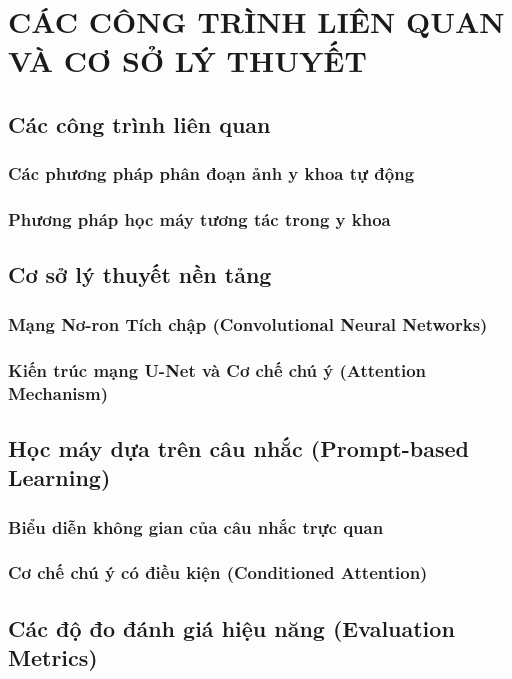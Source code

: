 \documentclass[a4paper,12pt,oneside]{report}
\begin{document}
\chapter{CÁC CÔNG TRÌNH LIÊN QUAN VÀ CƠ SỞ LÝ THUYẾT}
\section{Các công trình liên quan}
\subsection{Các phương pháp phân đoạn ảnh y khoa tự động}
\subsection{Phương pháp học máy tương tác trong y khoa}

\section{Cơ sở lý thuyết nền tảng}
\subsection{Mạng Nơ-ron Tích chập (Convolutional Neural Networks)}
\subsection{Kiến trúc mạng U-Net và Cơ chế chú ý (Attention Mechanism)}

\section{Học máy dựa trên câu nhắc (Prompt-based Learning)}
\subsection{Biểu diễn không gian của câu nhắc trực quan}
\subsection{Cơ chế chú ý có điều kiện (Conditioned Attention)}


\section{Các độ đo đánh giá hiệu năng (Evaluation Metrics)}
\end{document}
